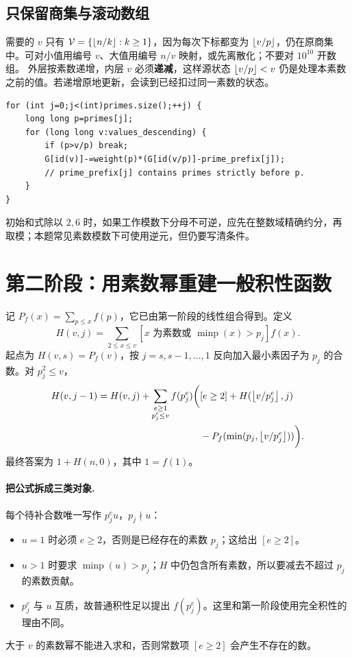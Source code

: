 \subsection{只保留商集与滚动数组}
需要的 $v$ 只有 $\mathcal V=\{\left\lfloor n/k\right\rfloor:k\ge1\}$，因为每次下标都变为 $\left\lfloor v/p\right\rfloor$，仍在原商集中。可对小值用编号 $v$、大值用编号 $n/v$ 映射，或先离散化；不要对 $10^{10}$ 开数组。
外层按素数递增，内层 $v$ 必须\textbf{递减}，这样源状态 $\left\lfloor v/p\right\rfloor<v$ 仍是处理本素数之前的值。若递增原地更新，会读到已经扣过同一素数的状态。
\begin{lstlisting}
for (int j=0;j<(int)primes.size();++j) {
    long long p=primes[j];
    for (long long v:values_descending) {
        if (p>v/p) break;
        G[id(v)]-=weight(p)*(G[id(v/p)]-prime_prefix[j]);
        // prime_prefix[j] contains primes strictly before p.
    }
}
\end{lstlisting}
初始和式除以 $2,6$ 时，如果工作模数下分母不可逆，应先在整数域精确约分，再取模；本题常见素数模数下可使用逆元，但仍要写清条件。


\section{第二阶段：用素数幂重建一般积性函数}
记 $P_f(x)=\sum_{p\le x}f(p)$，它已由第一阶段的线性组合得到。定义
\[
 H(v,j)=\sum_{2\le x\le v}
 [x\text{ 为素数或 }\operatorname{minp}(x)>p_j]f(x).
\]
起点为 $H(v,s)=P_f(v)$，按 $j=s,s-1,\ldots,1$ 反向加入最小素因子为 $p_j$ 的合数。对 $p_j^2\le v$，
\[
\begin{aligned}
 H(v,j-1)=H(v,j)+\sum_{\substack{e\ge1\\p_j^e\le v}} f(p_j^e)
 \biggl(&[e\ge2]+H(\left\lfloor v/p_j^e\right\rfloor,j)\\
 &-P_f(\min(p_j,\left\lfloor v/p_j^e\right\rfloor))\biggr).
\end{aligned}
\]
最终答案为 $1+H(n,0)$，其中 $1=f(1)$。


\paragraph{把公式拆成三类对象.}
每个待补合数唯一写作 $p_j^e u$，$p_j\nmid u$：
\begin{itemize}
\item $u=1$ 时必须 $e\ge2$，否则是已经存在的素数 $p_j$；这给出 $[e\ge2]$。
\item $u>1$ 时要求 $\operatorname{minp}(u)>p_j$；$H$ 中仍包含所有素数，所以要减去不超过 $p_j$ 的素数贡献。
\item $p_j^e$ 与 $u$ 互质，故普通积性足以提出 $f(p_j^e)$。这里和第一阶段使用完全积性的理由不同。
\end{itemize}
大于 $v$ 的素数幂不能进入求和，否则常数项 $[e\ge2]$ 会产生不存在的数。

